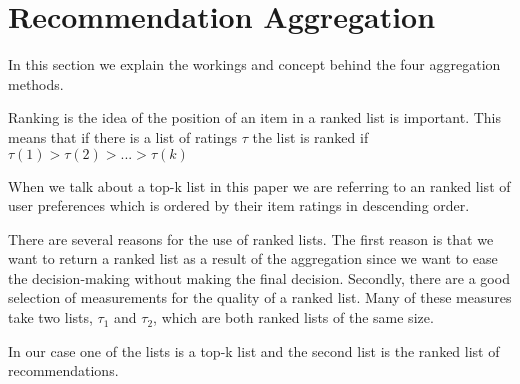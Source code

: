 \section{Recommendation Aggregation}\label{sec:aggregations}
In this section we explain the workings and concept behind the four aggregation methods.

Ranking is the idea of the position of an item in a ranked list is important. This means that if there is a list of ratings $\tau$ the list is ranked if $\tau (1) > \tau (2) > ... > \tau (k)$

When we talk about a top-k list in this paper we are referring to an ranked list of user preferences which is ordered by their item ratings in descending order.

There are several reasons for the use of ranked lists. 
The first reason is that we want to return a ranked list as a result of the aggregation since we want to ease the decision-making without making the final decision.
Secondly, there are a good selection of measurements for the quality of a ranked list. Many of these measures take two lists, $\tau_1$ and $\tau_2$, which are both ranked lists of the same size. 

In our case one of the lists is a top-k list and the second list is the ranked list of recommendations.



